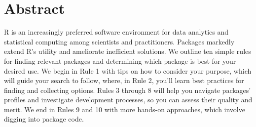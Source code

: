 \documentclass[10pt,letterpaper]{article}
\newcommand{\getIndex}[2]{
  \ForEach{,}{\IfEq{#1}{\thislevelitem}{\number\thislevelcount\ExitForEach}{}}{#2}
}
\newcommand{\getAff}[1]{
  \getIndex{#1}{Stats,Math,ERHS}
}
\begin{document}
\vspace*{0.2in}

\section*{Abstract}
R is an increasingly preferred software environment for data analytics
and statistical computing among scientists and practitioners. Packages
markedly extend R's utility and ameliorate inefficient solutions. We
outline ten simple rules for finding relevant packages and determining
which package is best for your desired use. We begin in Rule 1 with tips
on how to consider your purpose, which will guide your search to follow,
where, in Rule 2, you'll learn best practices for finding and collecting
options. Rules 3 through 8 will help you navigate packages' profiles and
investigate development processes, so you can assess their quality and
merit. We end in Rules 9 and 10 with more hands-on approaches, which
involve digging into package code.

\end{document}

